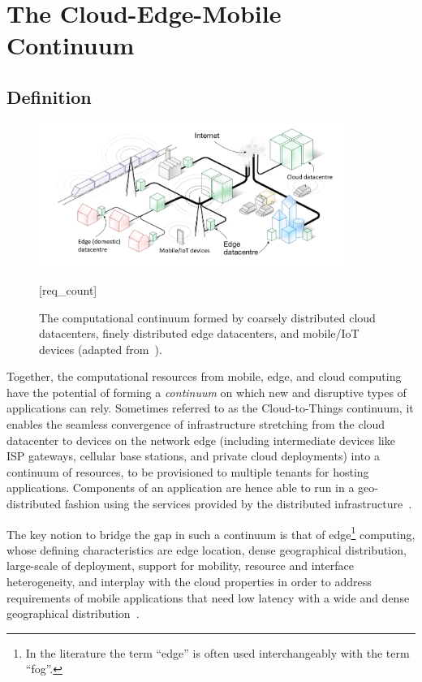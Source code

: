 \section{The Cloud-Edge-Mobile Continuum}\label{sec:continuum}

\subsection{Definition}

\begin{figure}[tbp]
	\includegraphics[width=0.9\textwidth]{figs/Continuum-overall.png}
	\caption{The computational continuum formed by coarsely distributed cloud datacenters, finely distributed edge datacenters, and mobile/IoT devices (adapted from~\cite{Tarneberg2017}).}
	\label{fig:continuum-overral}[req_count]
\end{figure}


Together, the computational resources from mobile, edge, and cloud computing have the potential of forming a \textit{continuum} on which new and disruptive types of applications can rely. Sometimes referred to as the Cloud-to-Things continuum, it enables the seamless convergence of infrastructure stretching from the cloud datacenter to devices on the network edge (including intermediate devices like ISP gateways, cellular base stations, and private cloud deployments) into a continuum of resources, to be provisioned to multiple tenants for hosting applications. Components of an application are hence able to run in a geo-distributed fashion using the services provided by the distributed infrastructure~\cite{GuptaIfogSim17}. 

The key notion to bridge the gap in such a continuum is that of edge\footnote{In the literature the term ``edge'' is often used interchangeably with the term ``fog''.} computing, whose defining characteristics are edge location, dense geographical distribution, large-scale of deployment, support for mobility, resource and interface heterogeneity, and interplay with the cloud properties in order to address requirements of mobile applications that need low latency with a wide and dense geographical distribution~\cite{Bonomi2014}.  



